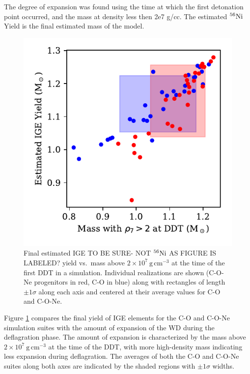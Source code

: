 \documentclass[iop,apj]{emulateapj}
\newcommand{\Ni}[1]{\ensuremath{{}^{#1}{\rm Ni}}}
\newcommand{\unitspace}{\ensuremath{\,}}
\newcommand{\usp}{\unitspace}
\newcommand{\unitstyle}[1]{\ensuremath{\mathrm{#1}}}
\newcommand{\power}[2]{\ensuremath{{#1}^{#2}}}
\newcommand{\centi}{\unitstyle{c}}
\newcommand{\meter}{\unitstyle{m}}
\newcommand{\cm}{\centi\meter}
\newcommand{\gram}{\unitstyle{g}}
\newcommand{\grampercc}{\gram\usp\power{\cm}{-3}} %
\begin{document}
The degree of expansion was found using the time at which the first
detonation point occurred, and the mass at density less then 2e7 g/cc. The
estimated \Ni{56} Yield is the final estimated mass of the model.

\begin{figure}
\includegraphics[width=\columnwidth]{figures/ni56_yield_vs_mass_at_high_dens.pdf}
\caption{\label{fig:masshighdens}
Final estimated IGE {\color{red} 
TO BE SURE- NOT \Ni{56} AS FIGURE IS LABELED?} yield 
vs.\ mass {\color{red} above} $2\times 10^7~\grampercc$
at the time of the first DDT in a simulation.  Individual 
realizations are shown (C-O-Ne
progenitors in red, C-O in blue) along with rectangles of length
$\pm 1 \sigma$ along each axis and centered at their average values 
for C-O and C-O-Ne.
}
\end{figure}

Figure \ref{fig:masshighdens} compares the final yield of IGE elements
for the C-O and C-O-Ne simulation suites with the amount of expansion of the
WD during the deflagration phase. The amount of expansion is 
characterized by the mass above $2 \times 10^7~\grampercc$ at the 
time of the DDT, with more high-density mass
indicating less expansion during deflagration. The averages of both
the C-O and C-O-Ne suites along both axes are indicated by the shaded
regions with $\pm1\sigma$ widths. 
\end{document}
